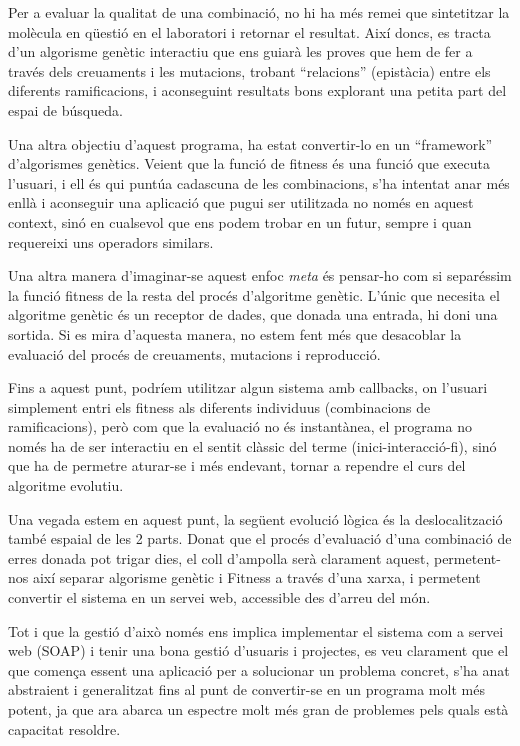 \documentclass[titlepage,a4paper,12pt]{book}
\begin{document}
	Per a evaluar la qualitat de una combinació, no hi ha més remei que
	sintetitzar la molècula en qüestió en el laboratori i retornar el resultat.
	Així doncs, es tracta d'un algorisme genètic interactiu %
	que ens guiarà les proves que hem de fer a través dels creuaments i les
	mutacions, trobant ``relacions'' (epistàcia) entre els diferents
	ramificacions, i aconseguint resultats bons explorant una petita part del
	espai de búsqueda.

	Una altra objectiu d'aquest programa, ha estat convertir-lo en un
	``framework'' d'algorismes genètics.  Veient que la funció de fitness és una
	funció que executa l'usuari, i ell és qui puntúa cadascuna de les
	combinacions, s'ha intentat anar més enllà i aconseguir una aplicació que
	pugui ser utilitzada no només en aquest context, sinó en cualsevol que ens
	podem trobar en un futur, sempre i quan requereixi uns operadors similars.

	Una altra manera d'imaginar-se aquest enfoc \emph{meta} és pensar-ho com si
	separéssim la funció fitness de la resta del procés d'algoritme genètic.
	L'únic que necesita el algoritme genètic és un receptor de dades, que
	donada una entrada, hi doni una sortida.  Si es mira d'aquesta manera, no
	estem fent més que desacoblar la evaluació del procés de creuaments,
	mutacions i reproducció.

	Fins a aquest punt, podríem utilitzar algun sistema amb callbacks, on
	l'usuari simplement entri els fitness als diferents individuus (combinacions
	de ramificacions), però com que la evaluació no és instantànea, el programa no
	només ha de ser interactiu en el sentit clàssic del terme (inici-interacció-fi),
	sinó que ha de permetre aturar-se i més endevant, tornar a rependre el curs
	del algoritme evolutiu. 

	Una vegada estem en aquest punt, la següent evolució lògica és la
	deslocalització també espaial de les 2 parts.  Donat que el procés
	d'evaluació d'una combinació de erres donada pot trigar dies, el coll
	d'ampolla serà clarament aquest, permetent-nos així separar algorisme
	genètic i Fitness a través d'una xarxa, i permetent convertir el sistema en
	un servei web, accessible des d'arreu del món.

	Tot i que la gestió d'això només ens implica implementar el sistema com a
	servei web (SOAP) i tenir una bona gestió d'usuaris i projectes, es veu
	clarament que el que comença essent una aplicació per a solucionar un
	problema concret, s'ha anat abstraient i generalitzat fins al punt de
	convertir-se en un programa molt més potent, ja que ara abarca un espectre
	molt més gran de problemes pels quals està capacitat resoldre.
\end{document}
